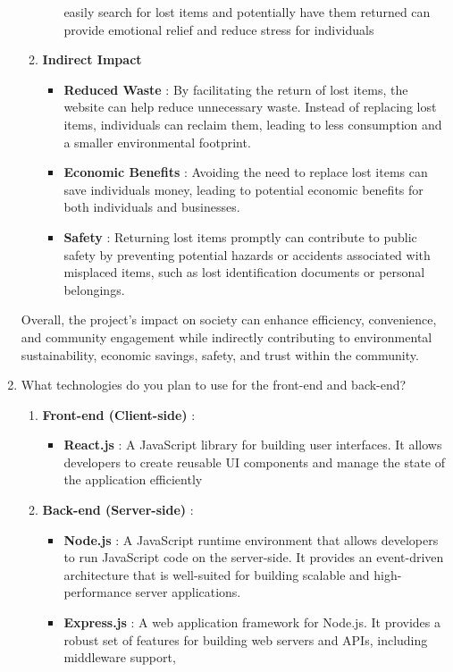 \documentclass[14pt]{article}
\begin{document}
\begin{enumerate}
\begin{enumerate}
\begin{itemize}
easily search for lost items and potentially have them returned can provide emotional relief and reduce stress for individuals
\end{itemize}
\item \textbf{Indirect Impact}
\begin{itemize}
\item \textbf{Reduced Waste} : By facilitating the return of lost items, the website can
help reduce unnecessary waste. Instead of replacing lost items, individuals can reclaim them, leading to less consumption and a smaller environmental
footprint.
\item \textbf{Economic Benefits} : Avoiding the need to replace lost items can save
individuals money, leading to potential economic benefits for both
individuals and businesses.
\item \textbf{Safety} : Returning lost items promptly can contribute to public safety by
preventing potential hazards or accidents associated with misplaced items, such as lost identification documents or personal belongings.
\end{itemize}
\end{enumerate}
\tabto{.5cm} Overall, the project's impact on society can enhance efficiency, convenience, and
community engagement while indirectly contributing to environmental sustainability, economic savings, safety, and trust within the community.
\item What technologies do you plan to use for the front-end and back-end?
\begin{enumerate}
\item \textbf{Front-end (Client-side)} :
\begin{itemize}
\item \textbf{React.js} : A JavaScript library for building user interfaces. It allows developers
to create reusable UI components and manage the state of the application
efficiently
\end{itemize}
\item \textbf{Back-end (Server-side)} :
\begin{itemize}
\item \textbf{Node.js} : A JavaScript runtime environment that allows developers to run
JavaScript code on the server-side. It provides an event-driven architecture that is well-suited for building scalable and high-performance server applications.
\item \textbf{Express.js} : A web application framework for Node.js. It provides a robust set
of features for building web servers and APIs, including middleware support,

\end{itemize}
\end{enumerate}
\end{enumerate}
\end{document}
